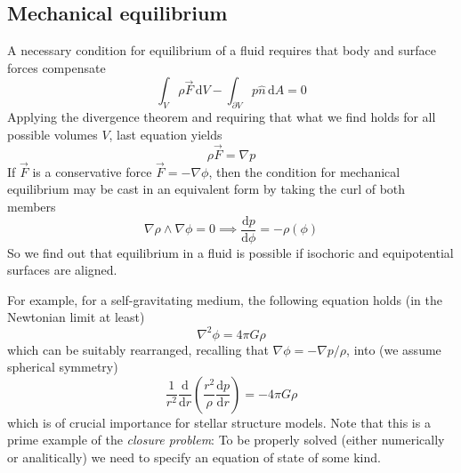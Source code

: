 \subsection{Mechanical equilibrium}
A necessary condition for equilibrium of a fluid requires that body and surface forces compensate 
\begin{equation*}
    \int_{V}\rho\vec{F}\,\text{d}V -\int_{\partial V} p\hat{n}\,\text{d}A = 0
\end{equation*}
Applying the divergence theorem and requiring that what we find holds for all possible volumes $V$, last equation yields
\begin{equation}
    \rho\vec{F} = \nabla p 
    \label{eq:fluideq}
\end{equation}
If $\vec{F}$ is a conservative force $\vec{F} = -\nabla\phi$, then the condition for mechanical equilibrium may be cast in an equivalent form by taking the curl of both members
\begin{equation*}
    \nabla\rho \wedge \nabla\phi = 0 \implies \frac{\text{d}p}{\text{d}\phi} = -\rho(\phi)
\end{equation*}
So we find out that equilibrium in a fluid is possible if isochoric and equipotential surfaces are aligned.
\par For example, for a self-gravitating medium, the following equation holds (in the Newtonian limit at least)
\begin{equation}
    \nabla^{2}\phi = 4\pi G\rho 
    \label{eq:poissongrav}
\end{equation}
which can be suitably rearranged, recalling that $\nabla\phi = -\nabla p/ \rho$, into (we assume spherical symmetry)
\begin{equation}
    \frac{1}{r^{2}}\frac{\text{d}}{\text{d}r}\left(\frac{r^{2}}{\rho}\frac{\text{d}p}{\text{d}r}\right) = -4\pi G\rho
    \label{eq:proto_le}
\end{equation}
which is of crucial importance for stellar structure models. Note that this is a prime example of the \emph{closure problem}: To be properly solved (either numerically or analitically) we need to specify an equation of state of some kind.

